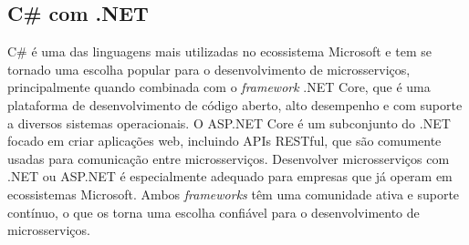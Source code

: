 \subsection{C\# com .NET}

C\# é uma das linguagens mais utilizadas no ecossistema Microsoft e tem se tornado uma escolha popular para o desenvolvimento de microsserviços, principalmente quando combinada com o \emph{framework} .NET Core, que é uma plataforma de desenvolvimento de código aberto, alto desempenho e com suporte a diversos sistemas operacionais. O ASP.NET Core é um subconjunto do .NET focado em criar aplicações web, incluindo APIs RESTful, que são comumente usadas para comunicação entre microsserviços. Desenvolver microsserviços com .NET ou ASP.NET é especialmente adequado para empresas que já operam em ecossistemas Microsoft. Ambos \emph{frameworks} têm uma comunidade ativa e suporte contínuo, o que os torna uma escolha confiável para o desenvolvimento de microsserviços. 
\cite{dotnetcore,aspnetcore}





